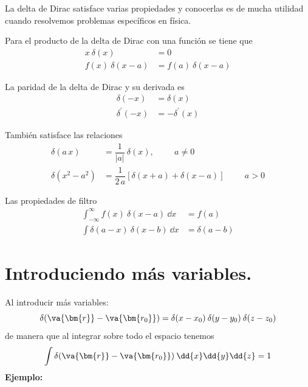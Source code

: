 La delta de Dirac satisface varias propiedades y conocerlas es de mucha utilidad cuando resolvemos problemas específicos en física. 
\par
\begin{propiedad}
Para el producto de la delta de Dirac con una función se tiene que
\begin{align}
x \: \delta(x) &= 0 \\
f(x) \: \delta(x - a) &= f(a) \: \delta(x - a)
\end{align}
\end{propiedad}
\begin{propiedad}
La paridad de la delta de Dirac y su derivada es
\begin{align}
\delta (-x) &= \delta (x) \\
\delta^{\prime} (-x) &= - \delta^{\prime} (x)
\end{align}
\end{propiedad}
\begin{propiedad}
También satisface las relaciones
\begin{align}
\delta(a \, x) &= \dfrac{1}{\vert a \vert} \: \delta (x), \hspace{1cm} a \neq 0 \\
\delta (x^{2} - a^{2}) &= \dfrac{1}{2 \, a} \left[ \delta (x + a) + \delta (x - a) \right] \hspace{1cm} a > 0
\end{align}
\end{propiedad}
\begin{propiedad}
Las propiedades de filtro
\begin{align}
\int_{-\infty}^{\infty} f(x) \: \delta (x - a) \: \dd{x} &= f(a) \\
\int \delta (a - x) \: \delta (x - b) \: \dd{x} &= \delta (a - b)
\end{align}
\end{propiedad}
\section{Introduciendo más variables.}
Al introducir más variables:
\begin{equation}
\delta (\va{\bm{r}} - \va{\bm{r_{0}}}) = \delta (x - x_{0}) \: \delta (y - y_{0}) \: \delta (z - z_{0})
\label{eq:ecuacion_A_03}
\end{equation}
de manera que al integrar sobre todo el espacio tenemos
\[ \int \delta (\va{\bm{r}} - \va{\bm{r_{0}}}) \: \dd{x} \dd{y}  \dd{z} = 1 \]
\textbf{Ejemplo:}

